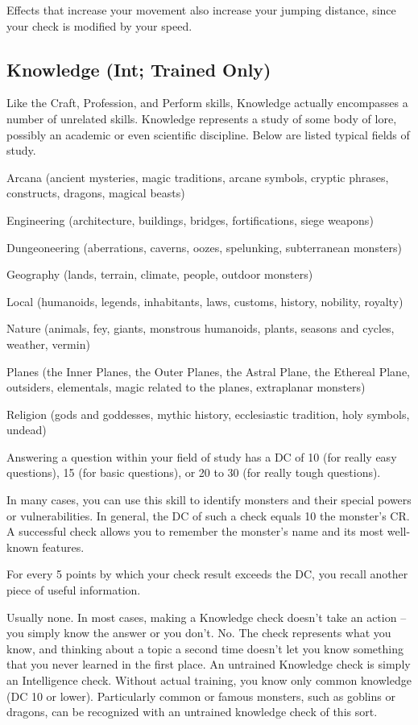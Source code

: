  Effects that increase your movement also increase your jumping distance, since your check is modified by your speed.

\subsection{Knowledge (Int; Trained Only)}
Like the Craft, Profession, and Perform skills, Knowledge actually encompasses a number of unrelated skills. Knowledge represents a study of some body of lore, possibly an academic or even scientific discipline. Below are listed typical fields of study.
\begin{itemize*}
\item Arcana (ancient mysteries, magic traditions, arcane symbols,
cryptic phrases, constructs, dragons, magical beasts)
\item Engineering (architecture, buildings, bridges, fortifications, siege weapons)
\item Dungeoneering (aberrations, caverns, oozes, spelunking, subterranean monsters)
\item Geography (lands, terrain, climate, people, outdoor monsters)
\item Local (humanoids, legends, inhabitants, laws, customs, history, nobility, royalty)
\item Nature (animals, fey, giants, monstrous humanoids, plants, seasons and cycles, weather, vermin)
\item Planes (the Inner Planes, the Outer Planes, the Astral Plane,
the Ethereal Plane, outsiders, elementals, magic related to the planes, extraplanar monsters)
\item Religion (gods and goddesses, mythic history, ecclesiastic tradition, holy symbols, undead)
\end{itemize*}
 Answering a question within your field of study has a DC of 10 (for really easy questions), 15 (for basic questions), or 20 to 30 (for really tough questions).

In many cases, you can use this skill to identify monsters and their special powers or vulnerabilities. In general, the DC of such a check equals 10 \add the monster's CR. A successful check allows you to remember the monster's name and its most well-known features.

For every 5 points by which your check result exceeds the DC, you recall another piece of useful information.

 Usually none. In most cases, making a Knowledge check doesn't take an action -- you simply know the answer or you don't.
 No. The check represents what you know, and thinking about a topic a second time doesn't let you know something that you never learned in the first place.
 An untrained Knowledge check is simply an Intelligence check. Without actual training, you know only common knowledge (DC 10 or lower). Particularly common or famous monsters, such as goblins or dragons, can be recognized with an untrained knowledge check of this sort.

